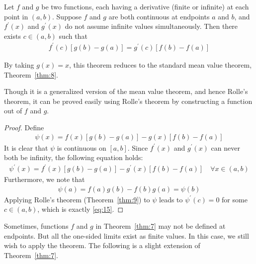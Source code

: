 \documentclass[thmcnt=section, 12pt]{my-elegantbook}
\begin{document}
\begin{theorem} \label{thm:7}
    Let $f$ and $g$ be two functions, each having a derivative (finite or infinite) at each point in $(a, b)$. Suppose $f$ and $g$ are both continuous at endpoints $a$ and $b$, and $f^\prime(x)$ and $g^\prime(x)$ do not assume infinite values simultaneously. Then there exists $c \in (a, b)$ such that
    \begin{align}
        f^\prime(c) [g(b) - g(a)]
        = g^\prime(c) [f(b) - f(a)]
        \label{eq:15}
    \end{align}
\end{theorem}

\begin{remark}
    By taking $g(x) = x$, this theorem reduces to the standard mean value theorem, Theorem~\ref{thm:8}.
\end{remark}

\par Though it is a generalized version of the mean value theorem, and hence Rolle's theorem, it can be proved easily using Rolle's theorem by constructing a function out of $f$ and $g$.

\begin{proof}
    Define
    \begin{align*}
        \psi(x) = f(x)[g(b) - g(a)] - g(x) [f(b) - f(a)]
    \end{align*}
    It is clear that $\psi$ is continuous on $[a, b]$. Since $f^\prime(x)$ and $g^\prime(x)$ can never both be infinity, the following equation holds:
    \begin{align*}
        \psi^\prime(x)
        = f^\prime(x)[g(b) - g(a)] - g^\prime(x) [f(b) - f(a)]
        \quad \forall x \in (a, b)
    \end{align*}
    Furthermore, we note that
    \begin{align*}
        \psi(a) = f(a)g(b) - f(b)g(a)
        = \psi(b)
    \end{align*}
    Applying Rolle's theorem (Theorem~\ref{thm:9}) to $\psi$ leads to $\psi^\prime(c) = 0$ for some $c \in (a, b)$, which is exactly \eqref{eq:15}.
\end{proof}


\par Sometimes, functions $f$ and $g$ in Theorem~\ref{thm:7} may not be defined at endpoints. But all the one-sided limits exist as finite values. In this case, we still wish to apply the theorem. The following is a slight extension of Theorem~\ref{thm:7}.
\end{document}
